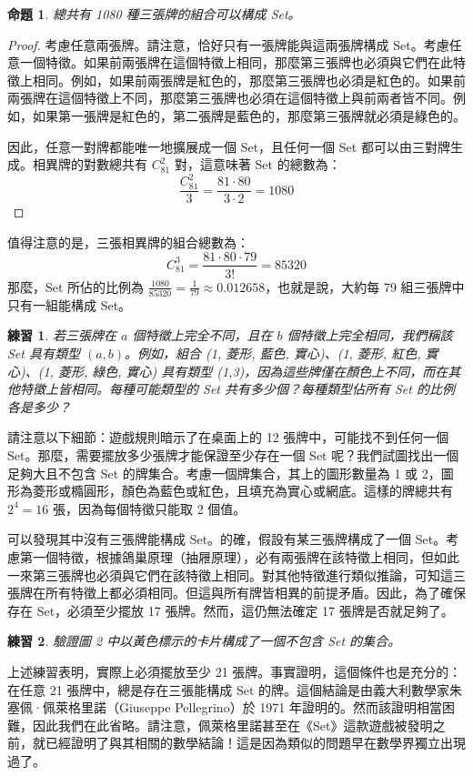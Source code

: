 \documentclass[12pt, a4paper]{article}
\newtheorem{proposition}{命題}
\newtheorem{exercise}{練習}
\begin{document}
\begin{proposition}
總共有 1080 種三張牌的組合可以構成 Set。
\end{proposition}
\begin{proof}
考慮任意兩張牌。請注意，恰好只有一張牌能與這兩張牌構成 Set。考慮任意一個特徵。如果前兩張牌在這個特徵上相同，那麼第三張牌也必須與它們在此特徵上相同。例如，如果前兩張牌是紅色的，那麼第三張牌也必須是紅色的。如果前兩張牌在這個特徵上不同，那麼第三張牌也必須在這個特徵上與前兩者皆不同。例如，如果第一張牌是紅色的，第二張牌是藍色的，那麼第三張牌就必須是綠色的。

因此，任意一對牌都能唯一地擴展成一個 Set，且任何一個 Set 都可以由三對牌生成。相異牌的對數總共有 $C_{81}^{2}$ 對，這意味著 Set 的總數為：
$$\frac{C_{81}^{2}}{3}=\frac{81\cdot80}{3\cdot2}=1080$$
\end{proof}

值得注意的是，三張相異牌的組合總數為：
$$C_{81}^{3}=\frac{81\cdot80\cdot79}{3!}=85320$$
那麼，Set 所佔的比例為 $\frac{1080}{85320}=\frac{1}{79}\approx0.012658$，也就是說，大約每 79 組三張牌中只有一組能構成 Set。

\begin{exercise}
若三張牌在 $a$ 個特徵上完全不同，且在 $b$ 個特徵上完全相同，我們稱該 Set 具有類型 $(a,b)$。例如，組合 (1, 菱形, 藍色, 實心)、(1, 菱形, 紅色, 實心)、(1, 菱形, 綠色, 實心) 具有類型 (1,3)，因為這些牌僅在顏色上不同，而在其他特徵上皆相同。每種可能類型的 Set 共有多少個？每種類型佔所有 Set 的比例各是多少？
\end{exercise}

請注意以下細節：遊戲規則暗示了在桌面上的 12 張牌中，可能找不到任何一個 Set。那麼，需要擺放多少張牌才能保證至少存在一個 Set 呢？我們試圖找出一個足夠大且不包含 Set 的牌集合。考慮一個牌集合，其上的圖形數量為 1 或 2，圖形為菱形或橢圓形，顏色為藍色或紅色，且填充為實心或網底。這樣的牌總共有 $2^{4}=16$ 張，因為每個特徵只能取 2 個值。

可以發現其中沒有三張牌能構成 Set。的確，假設有某三張牌構成了一個 Set。考慮第一個特徵，根據鴿巢原理（抽屜原理），必有兩張牌在該特徵上相同，但如此一來第三張牌也必須與它們在該特徵上相同。對其他特徵進行類似推論，可知這三張牌在所有特徵上都必須相同。但這與所有牌皆相異的前提矛盾。因此，為了確保存在 Set，必須至少擺放 17 張牌。然而，這仍無法確定 17 張牌是否就足夠了。

\begin{exercise}
驗證圖 2 中以黃色標示的卡片構成了一個不包含 Set 的集合。
\end{exercise}

上述練習表明，實際上必須擺放至少 21 張牌。事實證明，這個條件也是充分的：在任意 21 張牌中，總是存在三張能構成 Set 的牌。這個結論是由義大利數學家朱塞佩·佩萊格里諾（Giuseppe Pellegrino）於 1971 年證明的。然而該證明相當困難，因此我們在此省略。請注意，佩萊格里諾甚至在《Set》這款遊戲被發明之前，就已經證明了與其相關的數學結論！這是因為類似的問題早在數學界獨立出現過了。
\end{document}

